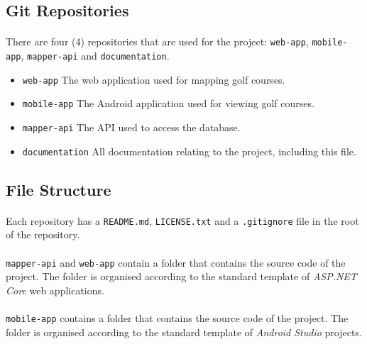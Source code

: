 \documentclass{article}
\begin{document}
    \subsection{Git Repositories}
    \label{sec}

    \paragraph{}
    There are four (4) repositories that are used for the project:
    \texttt{web-app}, \texttt{mobile-app}, \texttt{mapper-api} and
    \texttt{documentation}.

    \begin{itemize}
        \item \texttt{web-app}
            \subitem The web application used for mapping golf courses.
        \item \texttt{mobile-app}
            \subitem The Android application used for viewing golf courses.
        \item \texttt{mapper-api}
            \subitem The API used to access the database.
        \item \texttt{documentation}
            \subitem All documentation relating to the project, including this
                    file.
    \end{itemize}

    \subsection{File Structure}

    \paragraph{}
    Each repository has a \texttt{README.md}, \texttt{LICENSE.txt} and a
    \texttt{.gitignore} file in the root of the repository.

    \paragraph{}
    \texttt{mapper-api} and \texttt{web-app} contain a folder that contains
    the source code of the project. The folder is organised according to the
    standard template of \textit{ASP.NET Core} web applications.

    \paragraph{}
    \texttt{mobile-app} contains a folder that contains the source code of the
    project. The folder is organised according to the standard template of
    \textit{Android Studio} projects.
\end{document}
